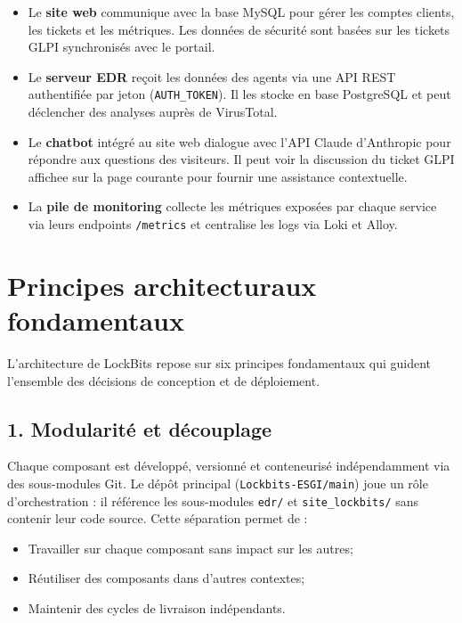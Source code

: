 \begin{itemize}
  \item Le \textbf{site web} communique avec la base MySQL pour gérer les
    comptes clients, les tickets et les métriques. Les données de sécurité
    sont basées sur les tickets GLPI synchronisés avec le portail.
  \item Le \textbf{serveur EDR} reçoit les données des agents via une API
    REST authentifiée par jeton (\texttt{AUTH\_TOKEN}). Il les stocke en
    base PostgreSQL et peut déclencher des analyses auprès de VirusTotal.
  \item Le \textbf{chatbot} intégré au site web dialogue avec l'API Claude
    d'Anthropic pour répondre aux questions des visiteurs. Il peut voir la
    discussion du ticket GLPI affichee sur la page courante pour fournir
    une assistance contextuelle.
  \item La \textbf{pile de monitoring} collecte les métriques exposées par
    chaque service via leurs endpoints \texttt{/metrics} et centralise les
    logs via Loki et Alloy.
\end{itemize}

\section{Principes architecturaux fondamentaux}

L'architecture de LockBits repose sur six principes fondamentaux qui
guident l'ensemble des décisions de conception et de déploiement.

\subsection*{1. Modularité et découplage}

Chaque composant est développé, versionné et conteneurisé indépendamment
via des sous-modules Git. Le dépôt principal (\texttt{Lockbits-ESGI/main})
joue un rôle d'orchestration : il référence les sous-modules
\texttt{edr/} et \texttt{site\_lockbits/} sans contenir leur code source.
Cette séparation permet de :
\begin{itemize}
  \item Travailler sur chaque composant sans impact sur les autres;
  \item Réutiliser des composants dans d'autres contextes;
  \item Maintenir des cycles de livraison indépendants.
\end{itemize}

